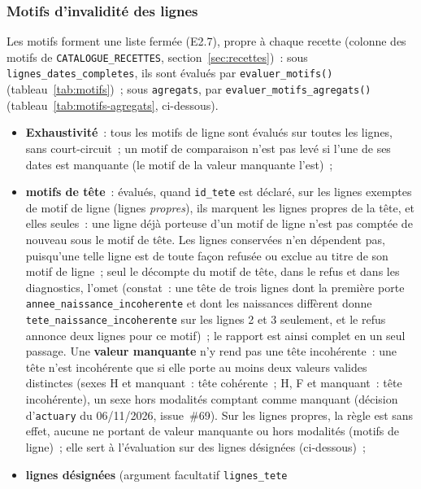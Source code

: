 \documentclass[a4paper,11pt]{article}
\newcommand{\code}[1]{\texttt{\small #1}}
\begin{document}
\subsubsection*{Motifs d'invalidité des lignes}

{\sloppy{} Les motifs forment une liste fermée (E2.7), propre à chaque recette
(colonne des motifs de \code{CATALOGUE\_RECETTES}, section~\ref{sec:recettes})~:
sous \code{lignes\_dates\_completes}, ils sont évalués par
\code{evaluer\_motifs()} (tableau~\ref{tab:motifs})~; sous
\code{agregats}, par \code{evaluer\_motifs\_agregats()}
(tableau~\ref{tab:motifs-agregats}, ci-dessous).\par}

\begin{itemize}[leftmargin=*, itemsep=2pt]
  \item \textbf{Exhaustivité}~: tous les motifs de ligne sont évalués sur toutes
    les lignes, sans court-circuit~; un motif de comparaison n'est pas levé si
    l'une de ses dates est manquante (le motif de la valeur manquante l'est)~;
  \item \textbf{motifs de tête}~: évalués, quand \code{id\_tete} est déclaré,
    sur les lignes exemptes de motif de ligne (lignes \emph{propres}), ils
    marquent les lignes propres de la tête, et elles seules~: une ligne déjà
    porteuse d'un motif de ligne n'est pas comptée de nouveau sous le motif
    de tête. Les lignes conservées n'en dépendent pas, puisqu'une telle ligne
    est de toute façon refusée ou exclue au titre de son motif de ligne~;
    seul le décompte du motif de tête, dans le refus et dans les
    diagnostics, l'omet (constat~: une tête de trois lignes dont la première
    porte \code{annee\_naissance\_incoherente} et dont les naissances
    diffèrent donne \code{tete\_naissance\_incoherente} sur les lignes 2 et 3
    seulement, et le refus annonce deux lignes pour ce motif)~; le rapport
    est ainsi complet en un seul passage. Une \textbf{valeur manquante} n'y
    rend pas une tête incohérente~: une tête n'est incohérente que si elle
    porte au moins deux valeurs valides distinctes (sexes H et manquant~:
    tête cohérente~; H, F et manquant~: tête incohérente), un sexe
    hors modalités comptant comme manquant (décision d'\code{actuary} du
    06/11/2026, issue~\#69). Sur les lignes propres, la règle est sans
    effet, aucune ne portant de valeur manquante ou hors modalités (motifs
    de ligne)~; elle sert à l'évaluation sur des lignes désignées
    (ci-dessous)~;
  \item \textbf{lignes désignées} (argument facultatif \code{lignes\_tete}

\end{itemize}
\end{document}

